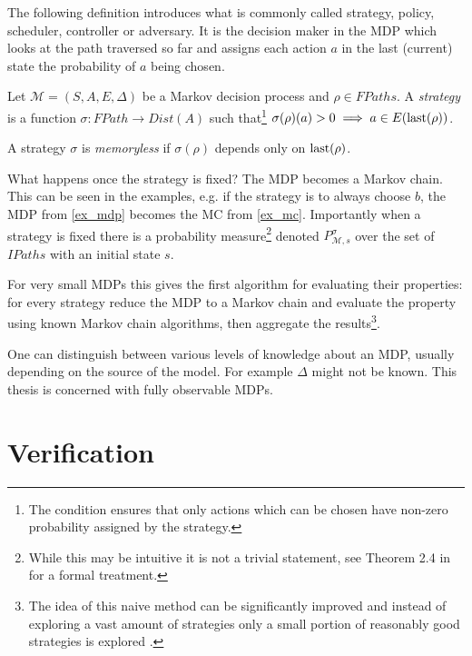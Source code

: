 The following definition introduces what is commonly called strategy,
policy, scheduler, controller or adversary. It is the decision maker in
the MDP which looks at the path traversed so far and assigns each action
$a$ in the last (current) state the probability of $a$ being chosen.

\begin{definition}[Strategy]
    Let $\mathcal{M} = (S,A,E,\Delta)$ be a Markov decision process
    and $\rho \in FPaths$.
    A {\em strategy} is a function
    $\sigma : FPath \to Dist(A)$
    such that\footnote{
The condition ensures that only actions which can
be chosen have non-zero probability assigned by the strategy.
    }
    $\sigma(\rho)(a) > 0 \implies a \in E(\operatorname{last}(\rho))$.

    A strategy $\sigma$ is {\em memoryless} if $\sigma(\rho)$ depends
    only on $\operatorname{last}(\rho)$.
\end{definition}

What happens once the strategy is fixed? The MDP becomes a Markov chain.
This can be seen in the examples, e.g. if the strategy is to always
choose $b$, the MDP from \autoref{ex_mdp} becomes the MC from
\autoref{ex_mc}.
Importantly when a strategy is fixed there is a probability
measure\footnote{While this may be intuitive it is not a trivial
statement, see Theorem 2.4 in \parencite{denumerable_mc} for a formal
treatment.} denoted $P^\sigma_{\mathcal{M},s}$ over the set of
$IPaths$ with an initial state $s$.

For very small MDPs this gives the first algorithm for evaluating
their properties: for every strategy reduce the MDP to a Markov chain
and evaluate the property using known Markov chain algorithms, then
aggregate the results\footnote{The idea of this naive method can be
significantly improved and instead of exploring a vast amount of
strategies only a small portion of reasonably good strategies is
explored \parencite{smc}.}.

One can distinguish between various levels of knowledge about an MDP,
usually depending on the source of the model. For example $\Delta$ might
not be known.
This thesis is concerned with fully observable MDPs.


\section{Verification}

